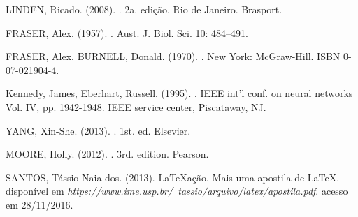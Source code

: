 \documentclass[a4paper,12pt]{article}
\begin{document}
\newpage


\thispagestyle{main}

\begin{thebibliography}{99} %

LINDEN, Ricado. (2008).
.
\newblock 2a. edição. Rio de Janeiro. Brasport.

FRASER, Alex. (1957).
.
\newblock Aust. J. Biol. Sci. 10: 484–491.

FRASER, Alex. BURNELL, Donald. (1970).
.
\newblock New York: McGraw-Hill. ISBN 0-07-021904-4.

Kennedy, James, Eberhart, Russell. (1995).
. IEEE int'l conf. on neural networks Vol. IV, pp. 1942-1948. IEEE service center, Piscataway, NJ.

YANG, Xin-She. (2013).
. 1st. ed. Elsevier.

MOORE, Holly. (2012).
.
\newblock 3rd. edition. Pearson.

SANTOS, Tássio Naia dos. (2013).
\newblock LaTeXação. Mais uma apostila de \LaTeX.
\newblock disponível em {\em https://www.ime.usp.br/~tassio/arquivo/latex/apostila.pdf}. acesso em 28/11/2016.

\end{thebibliography}

\appendix


\end{document}
